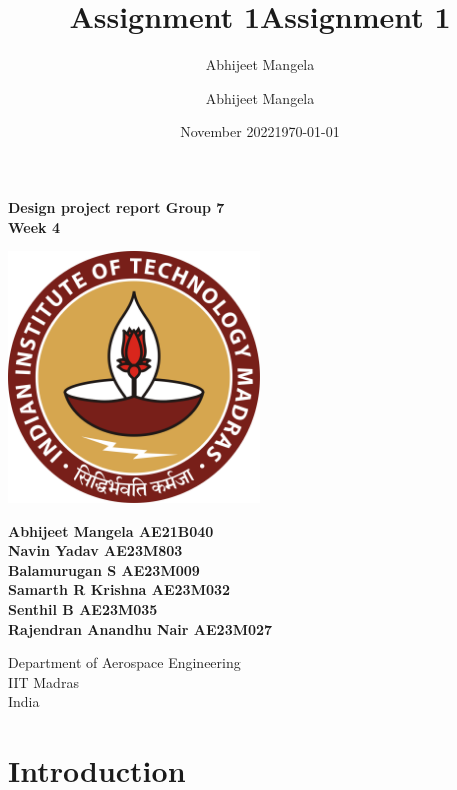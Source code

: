 \documentclass[12 pt]{article}
\title{Assignment 1}
\author{Abhijeet Mangela}
\date{November 2022}
\title{Assignment 1}
\author{Abhijeet Mangela}
\date{\today}
\begin{document}
\begin{titlepage}
\begin{center}

\textbf{\huge Design project report Group 7 \\ \vspace{0.4 cm} Week 4} \\

\vspace{2 cm}

\centering
\includegraphics[width=0.5\textwidth]{IIT_Madras_Logo.svg.png}
\label{fig:my_label}

\vspace{1cm}

\textbf{Abhijeet Mangela AE21B040 \\ Navin Yadav AE23M803 \\ Balamurugan S AE23M009 \\ Samarth R Krishna AE23M032 \\ Senthil B AE23M035 \\ Rajendran Anandhu Nair AE23M027 }

\vspace{0.5cm}

\footnotesize Department of Aerospace Engineering \\
IIT Madras \\
India

\normalsize

\end{center}
\end{titlepage}


\newpage

\tableofcontents

\newpage

\thispagestyle{empty}
\listoffigures
\listoftables
\newpage


\section{Introduction}
\end{document}
